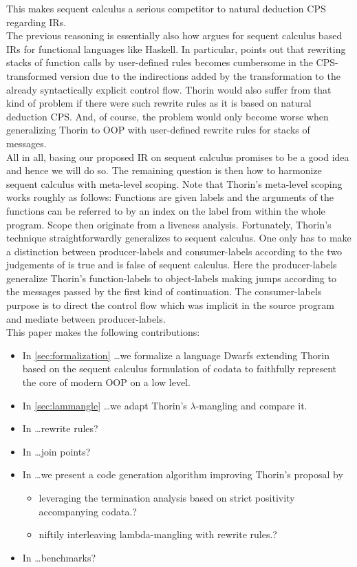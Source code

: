 This makes sequent calculus a serious competitor to natural deduction CPS regarding IRs.
\\
The previous reasoning is essentially also how \cite{seqcore} argues for sequent calculus based IRs for functional languages like Haskell.
In particular, \cite{seqcore} points out that rewriting stacks of function calls by user-defined rules becomes cumbersome in the CPS-transformed version due to the indirections added by the transformation to the already syntactically explicit control flow.
Thorin would also suffer from that kind of problem if there were such rewrite rules as it is based on natural deduction CPS.
And, of course, the problem would only become worse when generalizing Thorin to OOP with user-defined rewrite rules for stacks of messages.
\\
All in all, basing our proposed IR on sequent calculus promises to be a good idea and hence we will do so.
The remaining question is then how to harmonize sequent calculus with meta-level scoping.
Note that Thorin's meta-level scoping works roughly as follows:
Functions are given labels and the arguments of the functions can be referred to by an index on the label from within the whole program.
Scope then originate from a liveness analysis.
Fortunately, Thorin's technique straightforwardly generalizes to sequent calculus.
One only has to make a distinction between producer-labels and consumer-labels according to the two judgements of {\glqq}is true{\grqq} and {\glqq}is false{\grqq} of sequent calculus.
Here the producer-labels generalize Thorin's function-labels to object-labels making jumps according to the messages passed by the first kind of continuation.
The consumer-labels purpose is to direct the control flow which was implicit in the source program and mediate between producer-labels.
\\
This paper makes the following contributions:
\begin{itemize}
  \item
    In \cref{sec:formalization} \ldots we formalize a language Dwarfs extending Thorin based on the sequent calculus formulation of codata to faithfully represent the core of modern OOP on a low level.
  \item
    In \cref{sec:lammangle} \ldots we adapt Thorin's $\lambda$-mangling and compare it.
  \item
    In \ldots rewrite rules?
  \item
    In \ldots join points?
  \item
    In \ldots we present a code generation algorithm improving Thorin's proposal by
    \begin{itemize}
      \item
        leveraging the termination analysis based on strict positivity accompanying codata.?
      \item
        niftily interleaving lambda-mangling with rewrite rules.?
    \end{itemize}
  \item
    In \ldots benchmarks?
\end{itemize}
